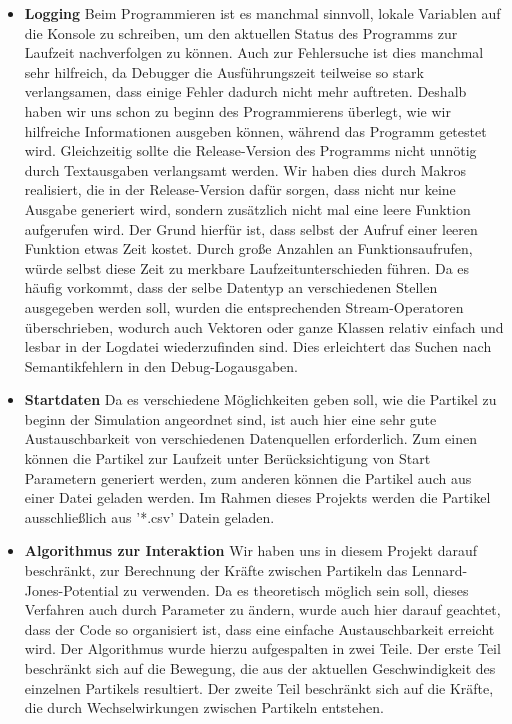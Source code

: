 \documentclass[
	12pt,
	a4paper,
	BCOR10mm,
	DIV14,
	headsepline,
]{scrreprt}
\begin{document}
\begin{itemize}
		\item \textbf{Logging} Beim Programmieren ist es manchmal sinnvoll, lokale Variablen auf die Konsole zu schreiben, um den aktuellen Status des Programms zur Laufzeit nachverfolgen zu können. Auch zur Fehlersuche ist dies manchmal sehr hilfreich, da Debugger die Ausführungszeit teilweise so stark verlangsamen, dass einige Fehler dadurch nicht mehr auftreten. Deshalb haben wir uns schon zu beginn des Programmierens überlegt, wie wir hilfreiche Informationen ausgeben können, während das Programm getestet wird. Gleichzeitig sollte die Release-Version des Programms nicht unnötig durch Textausgaben verlangsamt werden. Wir haben dies durch Makros realisiert, die in der Release-Version dafür sorgen, dass nicht nur keine Ausgabe generiert wird, sondern zusätzlich nicht mal eine leere Funktion aufgerufen wird. Der Grund hierfür ist, dass selbst der Aufruf einer leeren Funktion etwas Zeit kostet. Durch große Anzahlen an Funktionsaufrufen, würde selbst diese Zeit zu merkbare Laufzeitunterschieden führen. Da es häufig vorkommt, dass der selbe Datentyp an verschiedenen Stellen ausgegeben werden soll, wurden die entsprechenden Stream-Operatoren überschrieben, wodurch auch Vektoren oder ganze Klassen relativ einfach und lesbar in der Logdatei wiederzufinden sind. Dies erleichtert das Suchen nach Semantikfehlern in den Debug-Logausgaben.
		\item \textbf{Startdaten} Da es verschiedene Möglichkeiten geben soll, wie die Partikel zu beginn der Simulation angeordnet sind, ist auch hier eine sehr gute Austauschbarkeit von verschiedenen Datenquellen erforderlich. Zum einen können die Partikel zur Laufzeit unter Berücksichtigung von Start Parametern generiert werden, zum anderen können die Partikel auch aus einer Datei geladen werden. Im Rahmen dieses Projekts werden die Partikel ausschließlich aus '*.csv' Datein geladen.
		\item \textbf{Algorithmus zur Interaktion} Wir haben uns in diesem Projekt darauf beschränkt, zur Berechnung der Kräfte zwischen Partikeln das Lennard-Jones-Potential zu verwenden. Da es theoretisch möglich sein soll, dieses Verfahren auch durch Parameter zu ändern, wurde auch hier darauf geachtet, dass der Code so organisiert ist, dass eine einfache Austauschbarkeit erreicht wird. Der Algorithmus wurde hierzu aufgespalten in zwei Teile. Der erste Teil beschränkt sich auf die Bewegung, die aus der aktuellen Geschwindigkeit des einzelnen Partikels resultiert. Der zweite Teil beschränkt sich auf die Kräfte, die durch Wechselwirkungen zwischen Partikeln entstehen.

\end{itemize}
\end{document}
